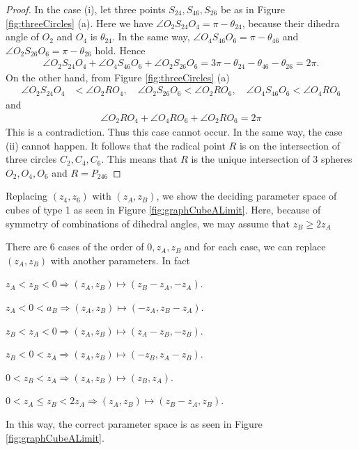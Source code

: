 \documentclass[suppldata, dvipdfmx]{interact}
\theoremstyle{plain}%
\theoremstyle{definition}
\theoremstyle{remark}
\theoremstyle{problemstyle}
\begin{document}
\begin{proof}
In the case (i), let three points $S_{24}, S_{46}, S_{26}$ be as in Figure
\ref{fig:threeCircles} (a). Here we have
$\angle O_2 S_{24} O_4 = \pi - \theta_{24}$,
because their dihedra angle of $O_2$ and $O_4$ is $\theta_{24}$.
In the same way, $\angle O_4 S_{46}O_6 = \pi - \theta_{46}$ and
$\angle O_2S_{26}O_6 = \pi-\theta_{26}$ hold. Hence
\begin{align*}
 \angle O_2 S_{24} O_4 + \angle O_4 S_{46} O_6 + \angle O_2 S_{26} O_6 = 3\pi -
 \theta_{24} - \theta_{46} - \theta_{26} = 2\pi.
\end{align*}
On the other hand, from Figure \ref{fig:threeCircles} (a)
\begin{align*}
 \angle O_2 S_{24} O_4 &< \angle O_2 R O_4,\quad 
 \angle O_2 S_{26} O_6 < \angle O_2 R O_6,\quad
 \angle O_4 S_{46} O_6 < \angle O_4 R O_6
\end{align*}
and
\begin{align*}
 \angle O_2 R O_4 + \angle O_4 R O_6 + \angle O_2 R O_6 = 2\pi
\end{align*}
This is a contradiction. Thus this case cannot occur. In the same way,
 the case (ii) cannot happen. It follows that the radical point $R$
 is on the intersection of three circles $C_2, C_4, C_6$.  This means that
 $R$ is the unique intersection of 3 spheres $O_2, O_4, O_6$ and $R=P_{246}$
\end{proof} 

Replacing $(z_4, z_6)$ with $(z_A, z_B)$, we show the deciding parameter space of cubes of type 1 as seen in Figure \ref{fig:graphCubeALimit}.  Here, because of symmetry of combinations of dihedral angles, we may assume that $z_B\ge 2z_A$

There are 6 cases of the order of $0, z_A, z_B$ and for each case, we can replace $(z_A, z_B)$ with another parameters.  In fact\par
 $z_A < z_B < 0 \Rightarrow (z_A, z_B) \mapsto (z_B-z_A, -z_A)$.\par
 $z_A < 0 < a_B \Rightarrow (z_A, z_B) \mapsto (-z_A, z_B-z_A)$.\par
 $z_B < z_A < 0 \Rightarrow (z_A, z_B) \mapsto (z_A-z_B, -z_B)$.\par
 $z_B < 0 < z_A \Rightarrow (z_A, z_B) \mapsto (-z_B, z_A-z_B)$.\par
 $0 < z_B < z_A \Rightarrow (z_A, z_B) \mapsto (z_B, z_A)$.\par
$0 < z_A \leq z_B < 2z_A \Rightarrow (z_A, z_B) \mapsto (z_B-z_A,z_B)$.\par
In this way, the correct parameter space is as seen in Figure \ref{fig:graphCubeALimit}. 
\end{document}
